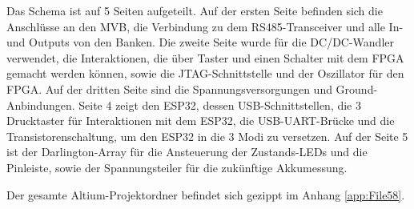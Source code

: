 Das Schema ist auf 5 Seiten aufgeteilt. Auf der ersten Seite befinden sich die Anschlüsse an den MVB, die Verbindung zu dem RS485-Transceiver und alle In- und Outputs von den Banken. Die zweite Seite wurde für die DC/DC-Wandler verwendet, die Interaktionen, die über Taster und einen Schalter mit dem FPGA gemacht werden können, sowie die JTAG-Schnittstelle und der Oszillator für den FPGA. Auf der dritten Seite sind die Spannungsversorgungen und Ground-Anbindungen. Seite 4 zeigt den ESP32, dessen USB-Schnittstellen, die 3 Drucktaster für Interaktionen mit dem ESP32, die USB-UART-Brücke und die Transistorenschaltung, um den ESP32 in die 3 Modi zu versetzen. Auf der Seite 5 ist der Darlington-Array für die Ansteuerung der Zustands-LEDs und die Pinleiste, sowie der Spannungsteiler für die zukünftige Akkumessung. 

Der gesamte Altium-Projektordner befindet sich gezippt im Anhang \ref{app:File58}.








